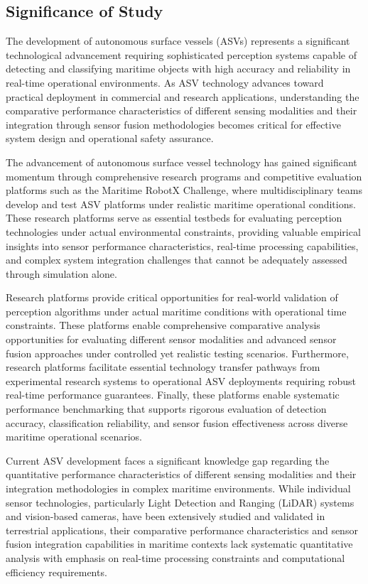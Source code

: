 \documentclass{erauthesis}
\begin{document}
\subsection{Significance of Study}

The development of autonomous surface vessels (ASVs) represents a significant technological advancement requiring sophisticated perception systems capable of detecting and classifying maritime objects with high accuracy and reliability in real-time operational environments. As ASV technology advances toward practical deployment in commercial and research applications, understanding the comparative performance characteristics of different sensing modalities and their integration through sensor fusion methodologies becomes critical for effective system design and operational safety assurance.

The advancement of autonomous surface vessel technology has gained significant momentum through comprehensive research programs and competitive evaluation platforms such as the Maritime RobotX Challenge, where multidisciplinary teams develop and test ASV platforms under realistic maritime operational conditions. These research platforms serve as essential testbeds for evaluating perception technologies under actual environmental constraints, providing valuable empirical insights into sensor performance characteristics, real-time processing capabilities, and complex system integration challenges that cannot be adequately assessed through simulation alone.

Research platforms provide critical opportunities for real-world validation of perception algorithms under actual maritime conditions with operational time constraints. These platforms enable comprehensive comparative analysis opportunities for evaluating different sensor modalities and advanced sensor fusion approaches under controlled yet realistic testing scenarios. Furthermore, research platforms facilitate essential technology transfer pathways from experimental research systems to operational ASV deployments requiring robust real-time performance guarantees. Finally, these platforms enable systematic performance benchmarking that supports rigorous evaluation of detection accuracy, classification reliability, and sensor fusion effectiveness across diverse maritime operational scenarios.

Current ASV development faces a significant knowledge gap regarding the quantitative performance characteristics of different sensing modalities and their integration methodologies in complex maritime environments. While individual sensor technologies, particularly Light Detection and Ranging (LiDAR) systems and vision-based cameras, have been extensively studied and validated in terrestrial applications, their comparative performance characteristics and sensor fusion integration capabilities in maritime contexts lack systematic quantitative analysis with emphasis on real-time processing constraints and computational efficiency requirements.
\end{document}
